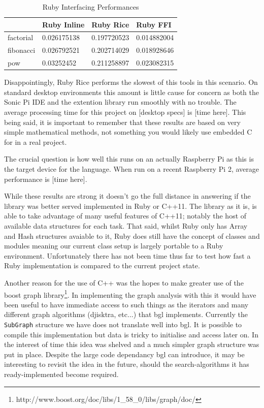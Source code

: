 \documentclass[11pt, abstracton, twoside]{scrartcl}
\begin{document}
\begin{table}[h]
	\centering
	\caption{Ruby Interfacing Performances \cite{amber}} \label{ruby}
	\label{my-label}
	\begin{tabular}{llll}
	          & Ruby Inline & Ruby Rice   & Ruby FFI  \\ \hline
	factorial & 0.026175138 & 0.197720523 & 0.014882004  \\
	fibonacci & 0.026792521 & 0.202714029 & 0.018928646  \\
	pow       & 0.03252452  & 0.211258897 & 0.023082315
	\end{tabular}
\end{table}

Disappointingly, Ruby Rice performs the slowest of this tools in this scenario. 
On standard desktop environments this amount is little cause for concern as both
the Sonic Pi IDE and the extention library run smoothly with no trouble. The average
processing time for this project on [desktop specs] is [time here]. This being said,
it is important to remember that these results are based on very simple mathematical 
methods, not something you would likely use embedded C for in a real project.

The crucial question is how well this runs on an actually Raspberry Pi as this is
the target device for the language. When run on a recent Raspberry Pi 2, average
performance is [time here].

While these results are strong it doesn't go the full distance in answering if the
library was better served implemented in Ruby or C++11. The library as it is, is able
to take advantage of many useful features of C++11; notably the host of available
data structures for each task. That said, whilst Ruby only has Array and Hash 
structures avaiable to it, Ruby does still have the concept of classes and modules 
meaning our current class setup is largely portable to a Ruby environment. 
Unfortunately there has not been time thus far to test how fast a Ruby implementation
is compared to the current project state.

Another reason for the use of C++ was the hopes to make greater use of the boost
graph library\footnote{http://www.boost.org/doc/libs/1\_58\_0/libs/graph/doc/}. 
In implementing the graph analysis with this it would have been useful to have
immediate access to such things as the iterators and many different graph algorithms
(djisktra, etc...) that bgl implements. Currently the \texttt{SubGraph} structure
we have does not translate well into bgl. It is possible to compile this 
implementation but data is tricky to initialise and access later on. In the interest
of time this idea was shelved and a much simpler graph structure was put in place.
Despite the large code dependancy bgl can introduce, it may be interesting to
revisit the idea in the future, should the search-algorithms it has ready-implemented
become required.
\end{document}
